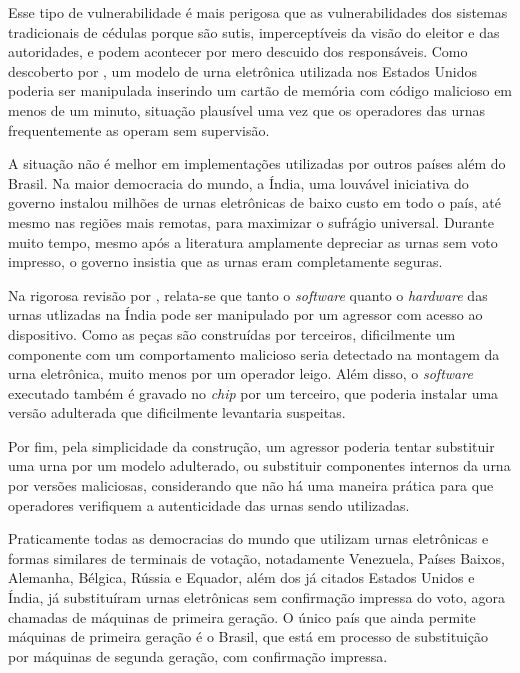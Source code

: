 Esse tipo de vulnerabilidade é mais perigosa que as vulnerabilidades dos
sistemas tradicionais de cédulas porque são sutis, imperceptíveis da visão do
eleitor e das autoridades, e podem acontecer por mero descuido dos
responsáveis. Como descoberto por \textcite{feldman2006security}, um modelo de
urna eletrônica utilizada nos Estados Unidos poderia ser manipulada inserindo
um cartão de memória com código malicioso em menos de um minuto, situação
plausível uma vez que os operadores das urnas frequentemente as operam sem
supervisão.

A situação não é melhor em implementações utilizadas por outros países além do
Brasil. Na maior democracia do mundo, a Índia, uma louvável iniciativa do
governo instalou milhões de urnas eletrônicas de baixo custo em todo o país,
até mesmo nas regiões mais remotas, para maximizar o sufrágio universal.
Durante muito tempo, mesmo após a literatura amplamente depreciar as urnas sem
voto impresso, o governo insistia que as urnas eram completamente seguras.

Na rigorosa revisão por \textcite{wolchok2010security}, relata-se que tanto o
\textit{software} quanto o \textit{hardware} das urnas utlizadas na Índia pode
ser manipulado por um agressor com acesso ao dispositivo. Como as peças são
construídas por terceiros, dificilmente um componente com um comportamento
malicioso seria detectado na montagem da urna eletrônica, muito menos por um
operador leigo. Além disso, o \textit{software} executado também é gravado no
\textit{chip} por um terceiro, que poderia instalar uma versão adulterada que
dificilmente levantaria suspeitas.

Por fim, pela simplicidade da construção, um agressor poderia tentar substituir
uma urna por um modelo adulterado, ou substituir componentes internos da urna
por versões maliciosas, considerando que não há uma maneira prática para que
operadores verifiquem a autenticidade das urnas sendo utilizadas.

Praticamente todas as democracias do mundo que utilizam urnas eletrônicas e
formas similares de terminais de votação, notadamente Venezuela, Países Baixos,
Alemanha, Bélgica, Rússia e Equador, além dos já citados Estados Unidos e
Índia, já substituíram urnas eletrônicas sem confirmação impressa do voto,
agora chamadas de máquinas de primeira geração. O único país que ainda permite
máquinas de primeira geração é o Brasil, que está em processo de substituição
por máquinas de segunda geração, com confirmação impressa.

